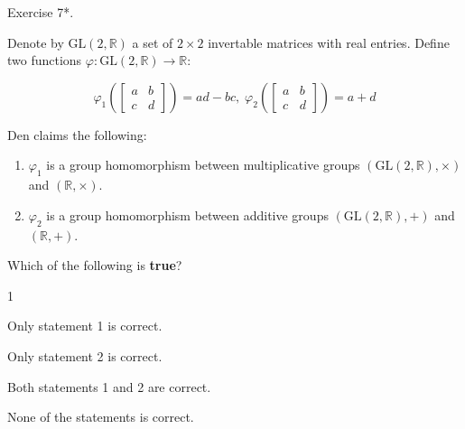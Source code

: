\documentclass[../lecture-notes-148x210.tex]{subfiles}
\begin{document}
\begin{xexercise}
    {Exercise 7*.}
    {
        Denote by $\text{GL}(2,\mathbb{R})$ a set of $2\times 2$ invertable matrices with real entries. Define 
        two functions $\varphi: \text{GL}(2,\mathbb{R}) \to \mathbb{R}$:
        
        \begin{equation*}
            \varphi_1 \left(\begin{bmatrix}
                a & b \\ c & d
            \end{bmatrix}\right) = ad - bc, \; \varphi_2 \left(\begin{bmatrix}
                a & b \\ c & d
            \end{bmatrix}\right) = a + d
        \end{equation*}
        
        Den claims the following:
        \begin{enumerate}
            \item $\varphi_1$ is a group homomorphism between multiplicative groups $(\text{GL}(2,\mathbb{R}), \times)$ and $(\mathbb{R}, \times)$.
            \item $\varphi_2$ is a group homomorphism between additive groups $(\text{GL}(2, \mathbb{R}), +)$ and $(\mathbb{R}, +)$.
        \end{enumerate}
        
        Which of the following is \textbf{true}?
    }
    {1}
    {
        \item Only statement 1 is correct.
        \item Only statement 2 is correct.
        \item Both statements 1 and 2 are correct.
        \item None of the statements is correct.
    }
\end{xexercise}
\end{document}

